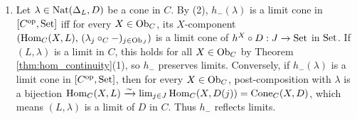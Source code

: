 \documentclass[10pt,a4paper]{article}
\begin{document}
\begin{enumerate}
\item Let $\lambda \in {\textrm{Nat}}(\Delta_L, D)$ be a cone in $C$. By (2), $h_-(\lambda)$ is a limit cone in $[C^{\textrm{op}}, {\textrm{Set}}]$ iff for every $X \in {\textrm{Ob}}_C$, its $X$-component $\left({\textrm{Hom}}_C(X, L),\, (\lambda_j \circ_C -)_{j \in {\textrm{Ob}}_J}\right)$ is a limit cone of $h^X \circ D : J \to {\textrm{Set}}$ in ${\textrm{Set}}$. If $(L, \lambda)$ is a limit in $C$, this holds for all $X \in {\textrm{Ob}}_C$ by Theorem \ref{thm:hom_continuity}(1), so $h_-$ preserves limits. Conversely, if $h_-(\lambda)$ is a limit cone in $[C^{\textrm{op}}, {\textrm{Set}}]$, then for every $X \in {\textrm{Ob}}_C$, post-composition with $\lambda$ is a bijection ${\textrm{Hom}}_C(X, L) \xrightarrow{\sim} \lim_{j \in J} {\textrm{Hom}}_C(X, D(j)) = {\mathrm{Cone}}_C(X, D)$, which means $(L, \lambda)$ is a limit of $D$ in $C$. Thus $h_-$ reflects limits.
\end{enumerate}
\myqed
\end{document}
